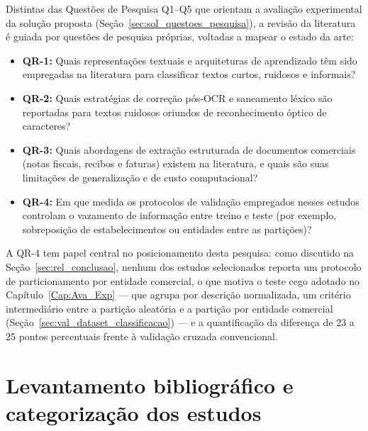 Distintas das Questões de Pesquisa Q1--Q5 que orientam a avaliação experimental da solução proposta (Seção~\ref{sec:sol_questoes_pesquisa}), a revisão da literatura é guiada por questões de pesquisa próprias, voltadas a mapear o estado da arte:
\begin{itemize}
	\item \textbf{QR-1:} Quais representações textuais e arquiteturas de aprendizado têm sido empregadas na literatura para classificar textos curtos, ruidosos e informais?
	\item \textbf{QR-2:} Quais estratégias de correção pós-OCR e saneamento léxico são reportadas para textos ruidosos oriundos de reconhecimento óptico de caracteres?
	\item \textbf{QR-3:} Quais abordagens de extração estruturada de documentos comerciais (notas fiscais, recibos e faturas) existem na literatura, e quais são suas limitações de generalização e de custo computacional?
	\item \textbf{QR-4:} Em que medida os protocolos de validação empregados nesses estudos controlam o vazamento de informação entre treino e teste (por exemplo, sobreposição de estabelecimentos ou entidades entre as partições)?
\end{itemize}

A QR-4 tem papel central no posicionamento desta pesquisa: como discutido na Seção~\ref{sec:rel_conclusao}, nenhum dos estudos selecionados reporta um protocolo de particionamento por entidade comercial, o que motiva o teste cego adotado no Capítulo~\ref{Cap:Ava_Exp} --- que agrupa por descrição normalizada, um critério intermediário entre a partição aleatória e a partição por entidade comercial (Seção~\ref{sec:val_dataset_classificacao}) --- e a quantificação da diferença de 23 a 25 pontos percentuais frente à validação cruzada convencional.

\section{Levantamento bibliográfico e categorização dos estudos}
\label{sec:rel_levantamento}

